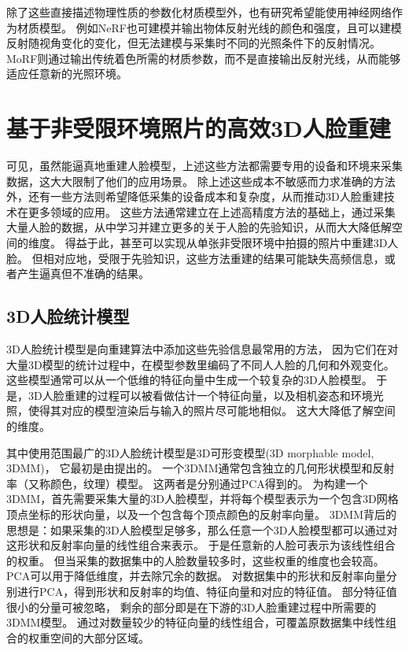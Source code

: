 除了这些直接描述物理性质的参数化材质模型外，也有研究希望能使用神经网络作为材质模型。
例如NeRF\citep{nerf}也可建模并输出物体反射光线的颜色和强度，且可以建模反射随视角变化的变化，但无法建模与采集时不同的光照条件下的反射情况。
MoRF\citep{MoRF}则通过输出传统着色所需的材质参数，而不是直接输出反射光线，从而能够适应任意新的光照环境。

\section{基于非受限环境照片的高效3D人脸重建}

可见，虽然能逼真地重建人脸模型，上述这些方法都需要专用的设备和环境来采集数据，这大大限制了他们的应用场景。
除上述这些成本不敏感而力求准确的方法外，还有一些方法则希望降低采集的设备成本和复杂度，从而推动3D人脸重建技术在更多领域的应用。
这些方法通常建立在上述高精度方法的基础上，通过采集大量人脸的数据，从中学习并建立更多的关于人脸的先验知识，从而大大降低解空间的维度。
得益于此，甚至可以实现从单张非受限环境中拍摄的照片中重建3D人脸\citep{danzhangtuxiangsanwei}。
但相对应地，受限于先验知识，这些方法重建的结果可能缺失高频信息，或者产生逼真但不准确的结果。

\subsection{3D人脸统计模型}

3D人脸统计模型是向重建算法中添加这些先验信息最常用的方法，
因为它们在对大量3D模型的统计过程中，在模型参数里编码了不同人人脸的几何和外观变化。
这些模型通常可以从一个低维的特征向量中生成一个较复杂的3D人脸模型。
于是，3D人脸重建的过程可以被看做估计一个特征向量，以及相机姿态和环境光照，使得其对应的模型渲染后与输入的照片尽可能地相似。
这大大降低了解空间的维度。

其中使用范围最广的3D人脸统计模型是3D可形变模型(3D morphable model, 3DMM)，
它最初是由\citet{3DMM}提出的。
一个3DMM通常包含独立的几何形状模型和反射率（又称颜色，纹理）模型。
这两者是分别通过PCA得到的。
为构建一个3DMM，首先需要采集大量的3D人脸模型，并将每个模型表示为一个包含3D网格顶点坐标的形状向量，以及一个包含每个顶点颜色的反射率向量。
3DMM背后的思想是：如果采集的3D人脸模型足够多，那么任意一个3D人脸模型都可以通过对这形状和反射率向量的线性组合来表示。
于是任意新的人脸可表示为该线性组合的权重。
但当采集的数据集中的人脸数量较多时，这些权重的维度也会较高。
PCA可以用于降低维度，并去除冗余的数据。
对数据集中的形状和反射率向量分别进行PCA，得到形状和反射率的均值、特征向量和对应的特征值。
部分特征值很小的分量可被忽略，
剩余的部分即是在下游的3D人脸重建过程中所需要的3DMM模型。
通过对数量较少的特征向量的线性组合，可覆盖原数据集中线性组合的权重空间的大部分区域。

